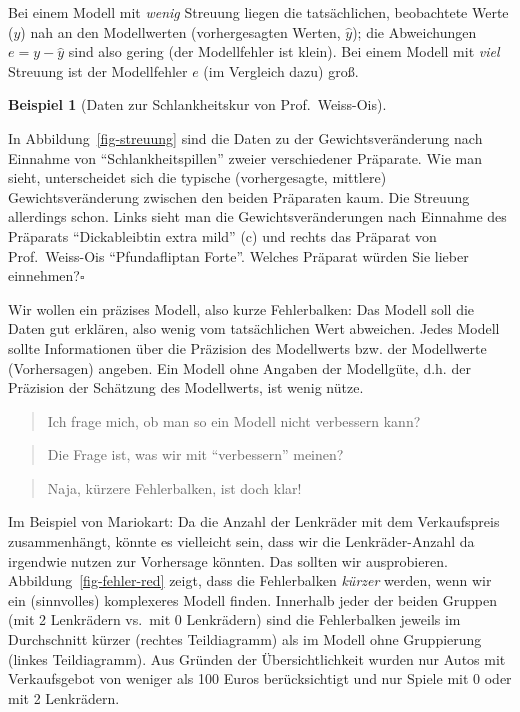 \documentclass[
  letterpaper,
  oneside,
  open=any]{scrbook}
\theoremstyle{definition}
\theoremstyle{definition}
\newtheorem{example}{Beispiel}[chapter]
\theoremstyle{definition}
\theoremstyle{remark}
\begin{document}
Bei einem Modell mit \emph{wenig} Streuung liegen die tatsächlichen,
beobachtete Werte (\(y\)) nah an den Modellwerten (vorhergesagten
Werten, \(\hat{y}\)); die Abweichungen \(e = y - \hat{y}\) sind also
gering (der Modellfehler ist klein). Bei einem Modell mit \emph{viel}
Streuung ist der Modellfehler \(e\) (im Vergleich dazu) groß.

\begin{example}[Daten zur Schlankheitskur von
Prof.~Weiss-Ois]\protect\hypertarget{exm-weiss-ois}{}\label{exm-weiss-ois}

In Abbildung~\ref{fig-streuung} sind die Daten zu der
Gewichtsveränderung nach Einnahme von \enquote{Schlankheitspillen}
zweier verschiedener Präparate. Wie man sieht, unterscheidet sich die
typische (vorhergesagte, mittlere) Gewichtsveränderung zwischen den
beiden Präparaten kaum. Die Streuung allerdings schon. Links sieht man
die Gewichtsveränderungen nach Einnahme des Präparats
\enquote{Dickableibtin extra mild} (c) und rechts das Präparat von
Prof.~Weiss-Ois \enquote{Pfundafliptan Forte}. Welches Präparat würden
Sie lieber einnehmen?\(\square\)

\end{example}

Wir wollen ein präzises Modell, also kurze Fehlerbalken: Das Modell soll
die Daten gut erklären, also wenig vom tatsächlichen Wert abweichen.
Jedes Modell sollte Informationen über die Präzision des Modellwerts
bzw. der Modellwerte (Vorhersagen) angeben. Ein Modell ohne Angaben der
Modellgüte, d.h. der Präzision der Schätzung des Modellwerts, ist wenig
nütze.

\begin{quote}
{} Ich frage mich, ob man so ein Modell nicht verbessern
kann?
\end{quote}

\begin{quote}
{} Die Frage ist, was wir mit \enquote{verbessern}
meinen?
\end{quote}

\begin{quote}
{} Naja, kürzere Fehlerbalken, ist doch klar!
\end{quote}

Im Beispiel von Mariokart: Da die Anzahl der Lenkräder mit dem
Verkaufspreis zusammenhängt, könnte es vielleicht sein, dass wir die
Lenkräder-Anzahl da irgendwie nutzen zur Vorhersage könnten. Das sollten
wir ausprobieren. Abbildung~\ref{fig-fehler-red} zeigt, dass die
Fehlerbalken \emph{kürzer} werden, wenn wir ein (sinnvolles) komplexeres
Modell finden. Innerhalb jeder der beiden Gruppen (mit 2 Lenkrädern
vs.~mit 0 Lenkrädern) sind die Fehlerbalken jeweils im Durchschnitt
kürzer (rechtes Teildiagramm) als im Modell ohne Gruppierung (linkes
Teildiagramm). Aus Gründen der Übersichtlichkeit wurden nur Autos mit
Verkaufsgebot von weniger als 100 Euros berücksichtigt und nur Spiele
mit 0 oder mit 2 Lenkrädern.
\end{document}
